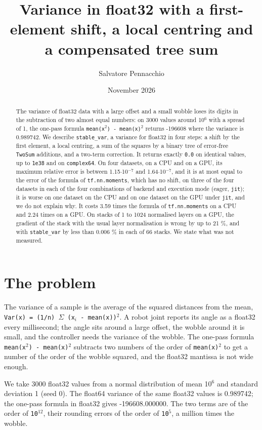 \documentclass[11pt]{article}
\title{Variance in float32 with a first-element shift, a local centring and a compensated tree sum}
\author{Salvatore Pennacchio}
\date{November 2026}
\begin{document}
\maketitle

\begin{abstract}
The variance of float32 data with a large offset and a small wobble loses its digits in the subtraction of two almost equal numbers: on 3000 values around 10$^{6}$ with a spread of 1, the one-pass formula \texttt{mean(x$^{2}$) - mean(x)$^{2}$} returns -196608 where the variance is 0.989742. We describe \texttt{stable\_var}, a variance for float32 in four steps: a shift by the first element, a local centring, a sum of the squares by a binary tree of error-free \texttt{TwoSum} additions, and a two-term correction. It returns exactly \texttt{0.0} on identical values, up to \texttt{1e38} and on \texttt{complex64}. On four datasets, on a CPU and on a GPU, its maximum relative error is between 1.15$\cdot$10$^{-7}$ and 1.64$\cdot$10$^{-7}$, and it is at most equal to the error of the formula of \texttt{tf.nn.moments}, which has no shift, on three of the four datasets in each of the four combinations of backend and execution mode (eager, \texttt{jit}); it is worse on one dataset on the CPU and on one dataset on the GPU under \texttt{jit}, and we do not explain why. It costs 3.59 times the formula of \texttt{tf.nn.moments} on a CPU and 2.24 times on a GPU. On stacks of 1 to 1024 normalised layers on a GPU, the gradient of the stack with the usual layer normalisation is wrong by up to 21 \%, and with \texttt{stable\_var} by less than 0.006 \% in each of 66 stacks. We state what was not measured.
\end{abstract}

\section{The problem}

The variance of a sample is the average of the squared distances from the mean, \texttt{Var(x) = (1/n) $\Sigma$ (x$_{i}$ - mean(x))$^{2}$}. A robot joint reports its angle as a float32 every millisecond; the angle sits around a large offset, the wobble around it is small, and the controller needs the variance of the wobble. The one-pass formula \texttt{mean(x$^{2}$) - mean(x)$^{2}$} subtracts two numbers of the order of \texttt{mean(x)$^{2}$} to get a number of the order of the wobble squared, and the float32 mantissa is not wide enough.

We take 3000 float32 values from a normal distribution of mean 10$^{6}$ and standard deviation 1 (seed 0). The float64 variance of the same float32 values is 0.989742; the one-pass formula in float32 gives -196608.000000. The two terms are of the order of \texttt{10$^{12}$}, their rounding errors of the order of \texttt{10$^{5}$}, a million times the wobble.
\end{document}
